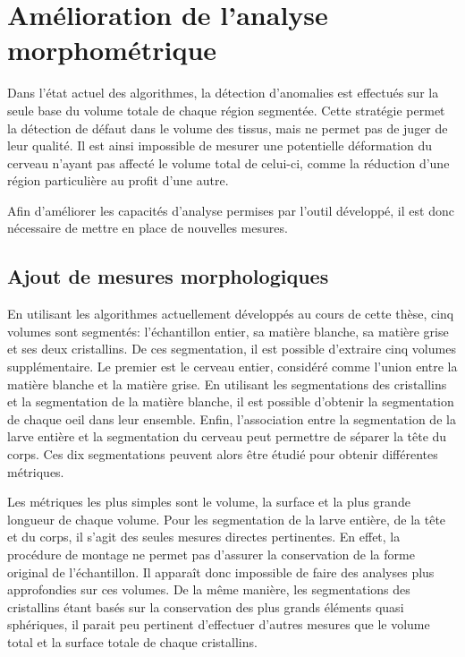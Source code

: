 \documentclass[\main/main.tex]{subfiles}
\begin{document}
                    
\section{Amélioration de l'analyse morphométrique}
%
Dans l'état actuel des algorithmes,
la détection d'anomalies est effectués sur la seule base du volume totale de chaque région segmentée.
%
Cette stratégie permet la détection de défaut dans le volume des tissus, mais ne permet pas de juger de leur qualité. 
%
Il est ainsi impossible de mesurer une potentielle déformation du cerveau n'ayant pas affecté le volume total de celui-ci, comme la réduction d'une région particulière au profit d'une autre.

Afin d'améliorer les capacités d'analyse permises par l'outil développé, il est donc nécessaire de mettre en place de nouvelles mesures.

    \subsection{Ajout de mesures morphologiques}

%
En utilisant les algorithmes actuellement développés au cours de cette thèse,
cinq volumes sont segmentés: l'échantillon entier, sa matière blanche, sa matière grise et ses deux cristallins.
%
De ces segmentation, il est possible d'extraire cinq volumes supplémentaire.
%
Le premier est le cerveau entier, considéré comme l'union entre la matière blanche et la matière grise.
%
En utilisant les segmentations des cristallins et la segmentation de la matière blanche, il est possible d'obtenir la segmentation de chaque oeil dans leur ensemble.
%
Enfin, l'association entre la segmentation de la larve entière et la segmentation du cerveau peut permettre de séparer la tête du corps.
%
Ces dix segmentations peuvent alors être étudié pour obtenir différentes métriques.

%
Les métriques les plus simples sont le volume, la surface et la plus grande longueur de chaque volume.
Pour les segmentation de la larve entière, de la tête et du corps,
il s'agit des seules mesures directes pertinentes.
%
En effet, la procédure de montage ne permet pas d'assurer la conservation de la forme original de l'échantillon.
%
Il apparaît donc impossible de faire des analyses plus approfondies sur ces volumes.
%
De la même manière, les segmentations des cristallins étant basés sur la conservation des plus grands éléments quasi sphériques,
il parait peu pertinent d'effectuer d'autres mesures que le volume total et la surface totale de chaque cristallins.
\end{document}
